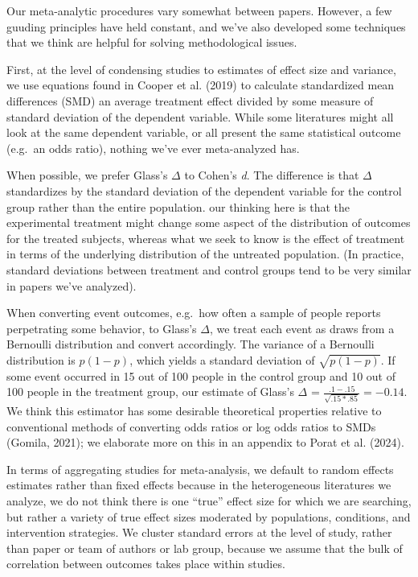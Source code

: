\documentclass[
  man]{apa6}
\begin{document}
Our meta-analytic procedures vary somewhat between papers. However, a few guuding principles have held constant, and we've also developed some techniques that we think are helpful for solving methodological issues.

First, at the level of condensing studies to estimates of effect size and variance, we use equations found in Cooper et al. (2019) to calculate standardized mean differences (SMD) \textemdash an average treatment effect divided by some measure of standard deviation of the dependent variable. While some literatures might all look at the same dependent variable, or all present the same statistical outcome (e.g.~an odds ratio), nothing we've ever meta-analyzed has.

When possible, we prefer Glass's \(\Delta\) to Cohen's \emph{d}. The difference is that \(\Delta\) standardizes by the standard deviation of the dependent variable for the control group rather than the entire population. our thinking here is that the experimental treatment might change some aspect of the distribution of outcomes for the treated subjects, whereas what we seek to know is the effect of treatment in terms of the underlying distribution of the untreated population. (In practice, standard deviations between treatment and control groups tend to be very similar in papers we've analyzed).

When converting event outcomes, e.g.~how often a sample of people reports perpetrating some behavior, to Glass's \(\Delta\), we treat each event as draws from a Bernoulli distribution and convert accordingly. The variance of a Bernoulli distribution is \(p (1-p)\), which yields a standard deviation of \(\sqrt{p(1-p)}\). If some event occurred in 15 out of 100 people in the control group and 10 out of 100 people in the treatment group, our estimate of Glass's \(\Delta\) = \(\frac{.1 - .15}{\sqrt{.15 * .85}} = -0.14\). We think this estimator has some desirable theoretical properties relative to conventional methods of converting odds ratios or log odds ratios to SMDs (Gomila, 2021); we elaborate more on this in an appendix to Porat et al. (2024).

In terms of aggregating studies for meta-analysis, we default to random effects estimates rather than fixed effects because in the heterogeneous literatures we analyze, we do not think there is one ``true'' effect size for which we are searching, but rather a variety of true effect sizes moderated by populations, conditions, and intervention strategies. We cluster standard errors at the level of study, rather than paper or team of authors or lab group, because we assume that the bulk of correlation between outcomes takes place within studies.
\end{document}
